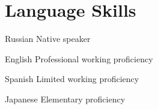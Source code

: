 \section
  {Language Skills}

\cvitem
  {Russian}
  {Native speaker}

\cvitem
  {English}
  {Professional working proficiency}

\cvitem
  {Spanish}
  {Limited working proficiency}

\cvitem
  {Japanese}
  {Elementary proficiency}